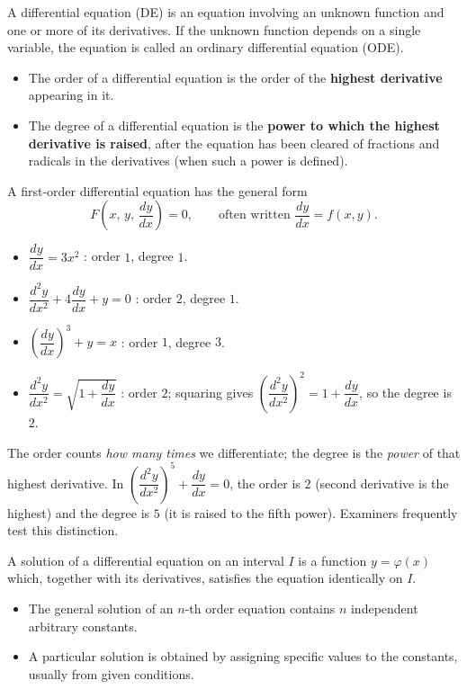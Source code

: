 \documentclass[11pt]{article}
\newcommand{\cle}[1]{{\popxbold\color{popdark}#1}}
\newcounter{popsec}
\newcounter{popsub}
\newcommand{\courssub}[1]{%
  \stepcounter{popsub}%
  \par\vspace{9pt}\noindent{\popxbold\fontsize{11.5}{13}\selectfont\color{popink}{\color{poporange}\thepopsec.\thepopsub}\hspace{6pt}#1}\par\nopagebreak\vspace{4pt}
}
\begin{document}
\courssub{What is a Differential Equation?}

\begin{definition}
A \cle{differential equation} (DE) is an equation involving an unknown function and one or more of its derivatives. If the unknown function depends on a single variable, the equation is called an \cle{ordinary differential equation} (ODE).
\begin{itemize}
\item The \cle{order} of a differential equation is the order of the \textbf{highest derivative} appearing in it.
\item The \cle{degree} of a differential equation is the \textbf{power to which the highest derivative is raised}, after the equation has been cleared of fractions and radicals in the derivatives (when such a power is defined).
\end{itemize}
A first-order differential equation has the general form
\[ F\!\left(x,\, y,\, \frac{dy}{dx}\right) = 0, \qquad \text{often written } \frac{dy}{dx} = f(x,y). \]
\end{definition}

\begin{exemplebox}
\begin{itemize}
\item $\dfrac{dy}{dx} = 3x^2$ : order $1$, degree $1$.
\item $\dfrac{d^2y}{dx^2} + 4\dfrac{dy}{dx} + y = 0$ : order $2$, degree $1$.
\item $\left(\dfrac{dy}{dx}\right)^3 + y = x$ : order $1$, degree $3$.
\item $\dfrac{d^2y}{dx^2} = \sqrt{1 + \dfrac{dy}{dx}}$ : order $2$; squaring gives $\left(\dfrac{d^2y}{dx^2}\right)^2 = 1 + \dfrac{dy}{dx}$, so the degree is $2$.
\end{itemize}
\end{exemplebox}

\begin{attention}
The \cle{order} counts \emph{how many times} we differentiate; the \cle{degree} is the \emph{power} of that highest derivative. In $\left(\dfrac{d^2y}{dx^2}\right)^5 + \dfrac{dy}{dx} = 0$, the order is $2$ (second derivative is the highest) and the degree is $5$ (it is raised to the fifth power). Examiners frequently test this distinction.
\end{attention}

\begin{definition}
A \cle{solution} of a differential equation on an interval $I$ is a function $y = \varphi(x)$ which, together with its derivatives, satisfies the equation identically on $I$.
\begin{itemize}
\item The \cle{general solution} of an $n$-th order equation contains $n$ independent arbitrary constants.
\item A \cle{particular solution} is obtained by assigning specific values to the constants, usually from given conditions.
\end{itemize}
\end{definition}
\end{document}
